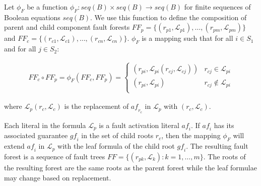 Let $\phi_F$ be a function $\phi _F: \mathit{seq(B)} \times \mathit{seq(B)} \rightarrow \mathit{seq(B)}$ for finite sequences of Boolean equations $\mathit{seq(B)}$. We use this function to define the composition of parent and child component fault forests $\mathit{FF}_p = \{(r_{p1},\mathcal{L}_{p1}), \dots, (r_ {pm}, \mathcal{L}_{pm})\}$ and $\mathit{FF}_c = \{(r_{c1},\mathcal{L}_{c1}), \dots, (r_ {cn}, \mathcal{L}_{cn})\}$. $\phi_F$ is a mapping such that for all $i \in S_1$ and for all $j \in S_2$: 

\begin{gather}
\mathit{FF}_c \circ \mathit{FF}_p = \phi_F(\mathit{FF}_c, \mathit{FF}_p) =\begin{cases} 
      (r_{pi}, \mathcal{L}_{pi}(r_{cj}, \mathcal{L}_{cj})) & r_{cj} \in \mathcal{L}_{pi} \\
      (r_{pi}, \mathcal{L}_{pi}) & r_{cj} \not\in \mathcal{L}_{pi} \\
   \end{cases}
\end{gather}

where $\mathcal{L}_p(r_c, \mathcal{L}_c)$ is the replacement of $\mathit{af_{r_c}}$ in $\mathcal{L}_p$ with $(r_c, \mathcal{L}_c)$.

Each literal in the formula $\mathcal{L}_p$ is a fault activation literal $\mathit{af_i}$. If $\mathit{af_i}$ has its associated guarantee $\mathit{gf_i}$ in the set of child roots $r_c$, then the mapping $\phi_F$ will extend $\mathit{af_i}$ in $\mathcal{L}_p$ with the leaf formula of the child root $\mathit{gf_i}$.  The resulting fault forest is a sequence of fault trees $\mathit{FF} = \{(r_{pk}, \mathcal{L}_{k}): k = 1,\dots,m\}$. The roots of the resulting forest are the same roots as  the parent forest while the leaf formulae may change based on replacement. 



